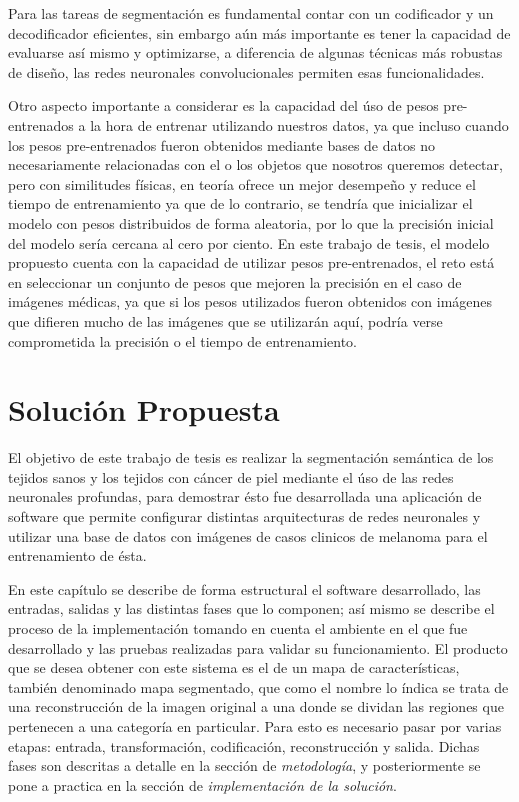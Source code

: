 Para las tareas de segmentación es fundamental contar con un codificador y un decodificador eficientes, sin embargo aún más importante es tener la capacidad de evaluarse así mismo y optimizarse, a diferencia de algunas técnicas más robustas de diseño, las redes neuronales convolucionales permiten esas funcionalidades.

Otro aspecto importante a considerar es la capacidad del úso de pesos pre-entrenados a la hora de entrenar utilizando nuestros datos, ya que incluso cuando los pesos pre-entrenados fueron obtenidos mediante bases de datos no necesariamente relacionadas con el o los objetos que nosotros queremos detectar, pero con similitudes físicas, en teoría ofrece un mejor desempeño y reduce el tiempo de entrenamiento ya que de lo contrario, se tendría que inicializar el modelo con pesos distribuidos de forma aleatoria, por lo que la precisión inicial del modelo sería cercana al cero por ciento. En este trabajo de tesis, el modelo propuesto cuenta con la capacidad de utilizar pesos pre-entrenados, el reto está en seleccionar un conjunto de pesos que mejoren la precisión en el caso de imágenes médicas, ya que si los pesos utilizados fueron obtenidos con imágenes que difieren mucho de las imágenes que se utilizarán aquí, podría verse comprometida la precisión o el tiempo de entrenamiento.

\chapter{Solución Propuesta}

El objetivo de este trabajo de tesis es realizar la segmentación semántica de los tejidos sanos y los tejidos con cáncer de piel mediante el úso de las redes neuronales profundas, para demostrar ésto fue desarrollada una aplicación de software que permite configurar distintas arquitecturas de redes neuronales y utilizar una base de datos con imágenes de casos clinicos de melanoma para el entrenamiento de ésta.

En este capítulo se describe de forma estructural el software desarrollado, las entradas, salidas y las distintas fases que lo componen; así mismo se describe el proceso de la implementación tomando en cuenta el ambiente en el que fue desarrollado y las pruebas realizadas para validar su funcionamiento. El producto que se desea obtener con este sistema es el de un mapa de características, también denominado mapa segmentado, que como el nombre lo índica se trata de una reconstrucción de la imagen original a una donde se dividan las regiones que pertenecen a una categoría en particular. Para esto es necesario pasar por varias etapas: entrada, transformación, codificación, reconstrucción y salida. Dichas fases son descritas a detalle en la sección de \emph{metodología}, y posteriormente se pone a practica en la sección de \emph{implementación de la solución}.

